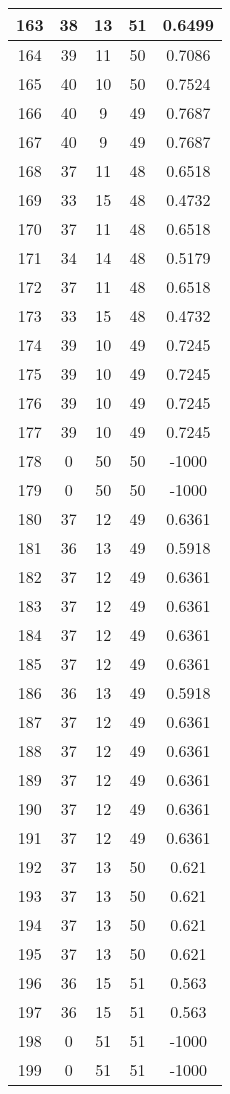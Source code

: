 \documentclass[letterpaper, 12pt]{article}
\begin{document}
\begin{longtable}{|c|c|c|c|c|}
\hline
163 & 38 & 13 & 51 & 0.6499 \\
\hline
164 & 39 & 11 & 50 & 0.7086 \\
\hline
165 & 40 & 10 & 50 & 0.7524 \\
\hline
166 & 40 & 9 & 49 & 0.7687 \\
\hline
167 & 40 & 9 & 49 & 0.7687 \\
\hline
168 & 37 & 11 & 48 & 0.6518 \\
\hline
169 & 33 & 15 & 48 & 0.4732 \\
\hline
170 & 37 & 11 & 48 & 0.6518 \\
\hline
171 & 34 & 14 & 48 & 0.5179 \\
\hline
172 & 37 & 11 & 48 & 0.6518 \\
\hline
173 & 33 & 15 & 48 & 0.4732 \\
\hline
174 & 39 & 10 & 49 & 0.7245 \\
\hline
175 & 39 & 10 & 49 & 0.7245 \\
\hline
176 & 39 & 10 & 49 & 0.7245 \\
\hline
177 & 39 & 10 & 49 & 0.7245 \\
\hline
178 & 0 & 50 & 50 & -1000 \\
\hline
179 & 0 & 50 & 50 & -1000 \\
\hline
180 & 37 & 12 & 49 & 0.6361 \\
\hline
181 & 36 & 13 & 49 & 0.5918 \\
\hline
182 & 37 & 12 & 49 & 0.6361 \\
\hline
183 & 37 & 12 & 49 & 0.6361 \\
\hline
184 & 37 & 12 & 49 & 0.6361 \\
\hline
185 & 37 & 12 & 49 & 0.6361 \\
\hline
186 & 36 & 13 & 49 & 0.5918 \\
\hline
187 & 37 & 12 & 49 & 0.6361 \\
\hline
188 & 37 & 12 & 49 & 0.6361 \\
\hline
189 & 37 & 12 & 49 & 0.6361 \\
\hline
190 & 37 & 12 & 49 & 0.6361 \\
\hline
191 & 37 & 12 & 49 & 0.6361 \\
\hline
192 & 37 & 13 & 50 & 0.621 \\
\hline
193 & 37 & 13 & 50 & 0.621 \\
\hline
194 & 37 & 13 & 50 & 0.621 \\
\hline
195 & 37 & 13 & 50 & 0.621 \\
\hline
196 & 36 & 15 & 51 & 0.563 \\
\hline
197 & 36 & 15 & 51 & 0.563 \\
\hline
198 & 0 & 51 & 51 & -1000 \\
\hline
199 & 0 & 51 & 51 & -1000 \\
\hline
\end{longtable}
\end{document}
